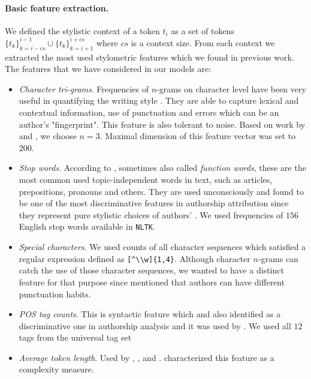 \documentclass[10pt, a4paper]{article}
\begin{document}
\paragraph{Basic feature extraction.} 
We defined the stylistic context of a token $t_i$ as a set of tokens $\{t_k\}_{k=i-cs}^{i-1} \cup \{t_k\}_{k=i+1}^{i+cs}$ where $cs$ is a context size. From each context we extracted the most used stylometric features which we found in previous work. The features that we have considered in our models are:
\begin{itemize}
	\item \textit{Character tri-grams}. Frequencies of $n$-grams on character level have been very useful in quantifying the writing style \citep{stamatatos-2009b}. They are able to capture lexical and contextual information, use of punctuation and errors which can be an author's "fingerprint". This feature is also tolerant to noise. Based on work by \citet{stamatatos-2009a} and \citet{rahman-2015}, we choose $n=3$. Maximal dimension of this feature vector was set to $200$.
	\item \textit{Stop words}. According to \citet{stamatatos-2009a}, sometimes also called \textit{function words}, these are the most common used topic-independent words in text, such as articles, prepositions, pronouns and others. They are used unconsciously and found to be one of the most discriminative features in authorship attribution since they represent pure stylistic choices of authors' \citep{burrows-1987,argamon-2005}. We used frequencies of $156$ English stop words available in \texttt{NLTK}.
	\item \textit{Special characters}. We used counts of all character sequences which satisfied a regular expression defined as \verb/[^\\w]{1,4}/. Although character $n$-grams can catch the use of those character sequences, we wanted to have a distinct feature for that purpose since \citet{koppel-2009} mentioned that authors can have different punctuation habits.
	\item \textit{POS tag counts}. This is syntactic feature which \citet{koppel-2009} and \citet{stamatatos-2009a} also identified as a discriminative one in authorship analysis and it was used by \citet{kuznetsov-2016}. We used all $12$ tags from the universal tag set
	\item \textit{Average token length}. Used by \citet{kuznetsov-2016}, \citet{sittar-2016},  \citet{brooke-2012} and \citet{stein-2011}. \citet{koppel-2009} characterized this feature as a complexity measure.

\end{itemize}
\end{document}
